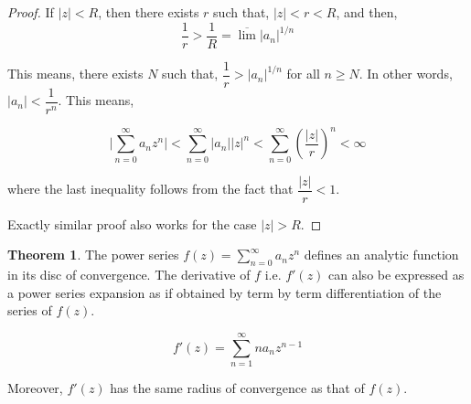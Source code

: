 \documentclass[12pt]{article}
\theoremstyle{definition}
\newtheorem{thm}{Theorem}
\newenvironment{theorem}{
\begin{tcolorbox}[colback=green!5!white,colframe=green!75!black, parbox = false]\begin{thm} }{\end{thm}\end{tcolorbox} }
\begin{document}
\begin{proof}
    If $\vert z \vert < R$, then there exists $r$ such that, $\vert z \vert < r < R$, and then,
    $$\dfrac{1}{r} > \dfrac{1}{R} = \overline{\lim}\vert a_n\vert^{1/n}$$

    This means, there exists $N$ such that,
    $\dfrac{1}{r} > \vert a_n\vert^{1/n}$ for all $n \geq N$. In other words, $\vert a_n \vert < \dfrac{1}{r^n}$. This means,

    $$\vert \sum_{n=0}^{\infty} a_n z^n\vert < \sum_{n = 0}^{\infty} \vert a_n \vert \vert z\vert^n < \sum_{n=0}^{\infty} \left(\dfrac{\vert z \vert}{r}\right)^n < \infty$$

    where the last inequality follows from the fact that $\dfrac{\vert z \vert}{r} < 1$.

    Exactly similar proof also works for the case $\vert z \vert > R$.
\end{proof}

\begin{theorem}
    The power series $f(z) = \sum_{n = 0}^{\infty} a_n z^n$ defines an analytic function in its disc of convergence. The derivative of $f$ i.e. $f'(z)$ can also be expressed as a power series expansion as if obtained by term by term differentiation of the series of $f(z)$.
    
    $$f'(z) = \sum_{n=1}^{\infty} na_n z^{n-1}$$

    Moreover, $f'(z)$ has the same radius of convergence as that of $f(z)$.
\end{theorem}
\end{document}
